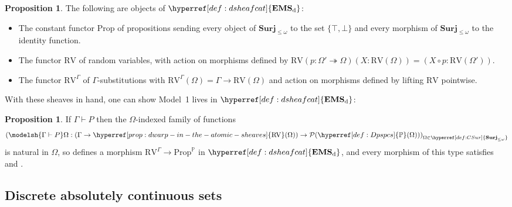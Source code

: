 \documentclass[
  sigconf,
  screen, ]{acmart}
\makeatletter
\theoremstyle{definition}
\newtheorem{proposition}[theorem]{Proposition}
\newcommand\calP{\mathcal P}
\newcommand{\labelword}[2]{\phantomsection
  #1\def\@currentlabel{\unexpanded{#1}}\label{#2}}
\newcommand\nref[2]{\hyperref[#1]{#2}} \newcommand\checkhigh{{\huge{\color{red}\textbf{TODO: check}}}}
\newcommand\vtrue{\top}
\newcommand\vfalse{\bot}
\newcommand\texagoodname{absolutely continuous set}
\newcommand\agoodnamenolink{\texagoodname}
\newcommand\goodsheafcat{\mathbf{EMS}}
\newcommand\CSur{{\nref{def:CSur}{\mathbf{Surj}_{\le\omega}}}}
\newcommand\Prop{{\nref{prop:ext-ren-inv-prop}{\mathrm{Prop}}}}
\newcommand\discsubscript{_{\rm d}}
\newcommand\Dpspcs{{\nref{def:Dpspcs}{\mathbb{P}}}}
\newcommand\DRVprelim{{\nref{def:DRVprelim}{\mathrm{RV}}}}
\newcommand\DRV{{\nref{prop:dwarp-in-the-atomic-sheaves}{\mathrm{RV}}}}
\newcommand\dsheafcat{{\nref{def:dsheafcat}{\goodsheafcat\discsubscript}}}
\makeatother
\begin{document}
\newcommand\DProp{\nref{def:DProp}{\mathrm{Prop}}}
\begin{proposition} \label{prop:dwarp-in-the-atomic-sheaves}
  The following are objects of $\dsheafcat$: \begin{itemize}[leftmargin=*]
    \item \labelword{The}{def:DProp} constant functor $\DProp$ of propositions sending every object
       of $\CSur$ to the set $\{\vtrue,\vfalse\}$ and every morphism
       of $\CSur$ to the identity function.
    \item The functor $\DRV$ of random variables,
      with action on morphisms
      defined by $\DRV(p : \Omega'\twoheadrightarrow\Omega)(X : \DRVprelim(\Omega))
      = (X\circ p : \DRVprelim(\Omega'))$.
    \item The functor $\DRV^\Gamma$
      of $\Gamma$-substitutions
      with $\DRV^\Gamma(\Omega) = \Gamma\to\DRV(\Omega)$
      and action on morphisms
      defined by lifting $\DRV$ pointwise.
  \end{itemize}
\end{proposition}
\noindent With these sheaves in hand,
one can show Model~1 lives in $\dsheafcat$:
\begin{proposition}
  If $\Gamma\vdash P$ then
  the $\Omega$-indexed family of functions
  \[
    \left(
      \modelsh{\Gamma\vdash P}\Omega
      : (\Gamma\to\DRV(\Omega))\to
      \calP(\Dpspcs(\Omega))
    \right)_{\Omega\in\CSur}
    \]
    is natural in $\Omega$,
    so defines a morphism $\DRV^\Gamma\to\Prop^\Dpspcs$
    in $\dsheafcat$, and every morphism
    of this type satisfies \probExtension{}
    and \probRestriction{}.
\end{proposition}

\subsection{Discrete \agoodnamenolink{s}}
\end{document}
